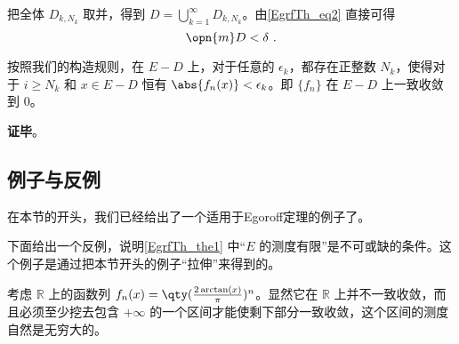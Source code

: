 把全体 $D_{k, N_k}$ 取并，得到 $D=\bigcup_{k=1}^\infty D_{k, N_k}$。由\autoref{EgrfTh_eq2} 直接可得
\begin{equation}
\opn{m}D<\delta~.
\end{equation}

按照我们的构造规则，在 $E-D$ 上，对于任意的 $\epsilon_k$，都存在正整数 $N_k$，使得对于 $i\geq N_k$ 和 $x\in E-D$ 恒有 $\abs{f_n(x)}<\epsilon_k$。即 $\{f_n\}$ 在 $E-D$ 上一致收敛到 $0$。

\textbf{证毕}。


\subsection{例子与反例}

在本节的开头，我们已经给出了一个适用于Egoroff定理的例子了。

下面给出一个反例，说明\autoref{EgrfTh_the1} 中“$E$ 的测度有限”是不可或缺的条件。这个例子是通过把本节开头的例子“拉伸”来得到的。


\begin{example}{}

考虑 $\mathbb{R}$ 上的函数列 $f_n(x)=\qty(\frac{2\arctan(x)}{\pi})^n$。显然它在 $\mathbb{R}$ 上并不一致收敛，而且必须至少挖去包含 $+\infty$ 的一个区间才能使剩下部分一致收敛，这个区间的测度自然是无穷大的。

\end{example}















